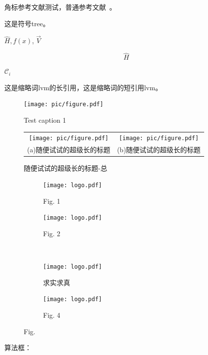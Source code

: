 \documentclass[master]{thesis-uestc}
\begin{document}
角标参考文献测试，普通参考文献~\cite{clerc2010discrete}。

这是符号\gls{tree}\cite{liuxf2006}。

$\hat{H}, f(x)$, $\vec{V}$

$$\hat{H}$$

$\mathcal{C}_i$

这是缩略词\acrlong{lvm}的长引用，这是缩略词的短引用\acrshort{lvm}。

\begin{figure}[!htb]
    \texttt{[image: pic/figure.pdf]}
    \caption[short catption 1]{Test caption 1}
\end{figure}


\begin{figure}[!htb]
    \small
    \centering
    \begin{tabular}{@{\ }c@{\ }c}
        \texttt{[image: pic/figure.pdf]} & 
        \hspace{5pt}
        \texttt{[image: pic/figure.pdf]}     \\
        \mbox{\small (a)随便试试的超级长的标题}                                                                               & 
        \mbox{\small (b)随便试试的超级长的标题}                                                                                  \\
    \end{tabular}
    \caption{随便试试的超级长的标题-总}
    \label{fig:test}
\end{figure}

\begin{figure}[!htbp]
    \centering
    \begin{subfigure}[t]{0.35\linewidth}
        \centering
        \texttt{[image: logo.pdf]}
        \caption{Fig. 1}
        \label{fig:1-1}
    \end{subfigure}
    \begin{subfigure}[t]{0.35\linewidth}
        \centering
        \texttt{[image: logo.pdf]}
        \caption{Fig. 2}
        \label{fig:1-2}
    \end{subfigure}
    \\[6bp]
    \begin{subfigure}[t]{0.35\linewidth}
        \centering
        \texttt{[image: logo.pdf]}
        \caption{求实求真}
        \label{fig:1-3}
    \end{subfigure}
    \begin{subfigure}[t]{0.35\linewidth}
        \centering
        \texttt{[image: logo.pdf]}
        \caption{Fig. 4}
        \label{fig:1-4}
    \end{subfigure}
    \caption{Fig.}
    \label{fig:1}
\end{figure}
算法框：
\end{document}
